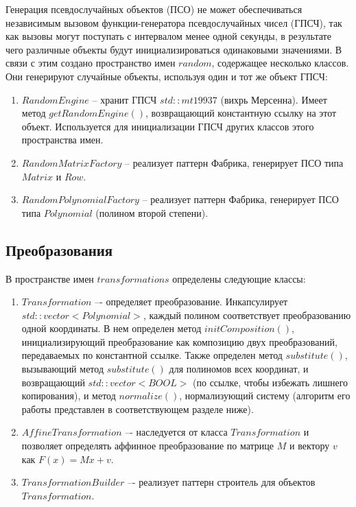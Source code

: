 Генерация псевдослучайных объектов (ПСО) не может обеспечиваться независимым вызовом функции-генератора псевдослучайных чисел (ГПСЧ), так как вызовы могут поступать с интервалом менее одной секунды, в результате чего различные объекты будут инициализироваться одинаковыми значениями. В связи с этим создано пространство имен \(random\), содержащее несколько классов. Они генерируют случайные объекты, используя один и тот же объект ГПСЧ:
\begin{enumerate}
	\item \(RandomEngine\) -- хранит ГПСЧ \(std::mt19937\) (вихрь Мерсенна). Имеет метод \(getRandomEngine()\), возвращающий константную ссылку на этот объект. Используется для инициализации ГПСЧ других классов этого пространства имен.
	\item \(RandomMatrixFactory\) -- реализует паттерн Фабрика, генерирует ПСО типа \(Matrix\) и \(Row\).
	\item \(RandomPolynomialFactory\) -- реализует паттерн Фабрика, генерирует ПСО типа \(Polynomial\) (полином второй степени).
\end{enumerate} 


\subsection{Преобразования} \label{ch2:subsec-title-abbr} %

В пространстве имен \(transformations\) определены следующие классы:
\begin{enumerate}
	\item \(Transformation\) –- определяет преобразование. Инкапсулирует \(std::vector<Polynomial>\), каждый полином соответствует преобразованию одной координаты. В нем определен метод \(initComposition()\), инициализирующий преобразование как композицию двух преобразований, передаваемых по константной ссылке. Также определен метод \(substitute()\), вызывающий метод \(substitute()\) для полиномов всех координат, и возвращающий \(std::vector<BOOL>\) (по ссылке, чтобы избежать лишнего копирования), и метод \(normalize()\), нормализующий систему (алгоритм его работы представлен в соответствующем разделе ниже).
	\item \(AffineTransformation\) –- наследуется от класса \(Transformation\) и позволяет определять аффинное преобразование по матрице \(M\) и вектору \(v\) как \(F(x) = Mx + v\).
	\item \(TransformationBuilder\) –- реализует паттерн строитель для объектов \(Transformation\).
\end{enumerate} 


